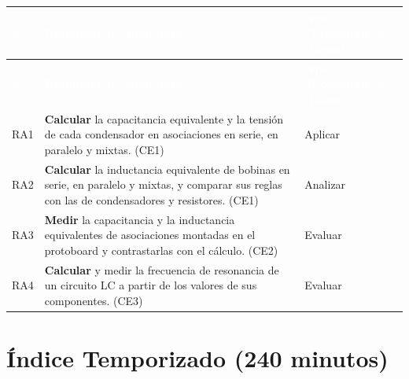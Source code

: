 \documentclass[11pt,letterpaper]{article}
\begin{document}
\begin{xltabular}{\linewidth}{>{\raggedright\arraybackslash}p{1.1cm}>{\raggedright\arraybackslash}X>{\raggedright\arraybackslash}p{3.9cm}}
 \textcolor{white}{\textbf{\#}} & \textcolor{white}{\textbf{Resultado de aprendizaje}} & \textcolor{white}{\textbf{Nivel (Taxonomía de Bloom)}} \\
\endfirsthead
{} \textcolor{white}{\textbf{\#}} & \textcolor{white}{\textbf{Resultado de aprendizaje}} & \textcolor{white}{\textbf{Nivel (Taxonomía de Bloom)}} \\
\endhead
\bottomrule
\endlastfoot
  RA1 & \textbf{Calcular} la capacitancia equivalente y la tensión de cada condensador en asociaciones en serie, en paralelo y mixtas. (CE1) & Aplicar \\
   RA2 & \textbf{Calcular} la inductancia equivalente de bobinas en serie, en paralelo y mixtas, y comparar sus reglas con las de condensadores y resistores. (CE1) & Analizar \\
  RA3 & \textbf{Medir} la capacitancia y la inductancia equivalentes de asociaciones montadas en el protoboard y contrastarlas con el cálculo. (CE2) & Evaluar \\
   RA4 & \textbf{Calcular} y medir la frecuencia de resonancia de un circuito LC a partir de los valores de sus componentes. (CE3) & Evaluar \\
\end{xltabular}

\section{Índice Temporizado (240 minutos)}
\end{document}

